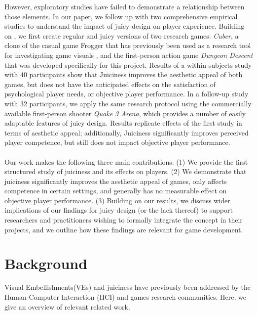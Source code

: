 \documentclass{sigchi}
\begin{document}
However, exploratory studies have failed to demonstrate a relationship between those elements. In our paper, we follow up with two comprehensive empirical studies to understand the impact of juicy design on player experience. Building on \cite{hicks2018juicy}, we first create regular and juicy versions of two research games: \textit{Cuber}, a clone of the casual game Frogger \cite{frogger:arcade} that has previously been used as a research tool for investigating game visuals \cite{gerling2013effects}, and the first-person action game \textit{Dungeon Descent} that was developed specifically for this project. Results of a within-subjects study with 40 participants show that Juiciness improves the aesthetic appeal of both games, but does not have the anticipated effects on the satisfaction of psychological player needs, or objective player performance. In a follow-up study with 32 participants, we apply the same research protocol using the commercially available first-person shooter \textit{Quake 3 Arena}, which provides a number of easily adaptable features of juicy design. Results replicate effects of the first study in terms of aesthetic appeal; additionally, Juiciness  significantly improves perceived player competence, but still does not impact objective player performance.
\\\\
Our work makes the following three main contributions: (1) We provide the first structured study of juiciness and its effects on players. (2) We demonstrate that juiciness significantly improves the aesthetic appeal of games, only affects competence in certain settings, and generally has no measurable effect on objective player performance. (3) Building on our results, we discuss wider implications of our findings for juicy design (or the lack thereof) to support researchers and practitioners wishing to formally integrate the concept in their projects, and we outline how these findings are relevant for game development.

\section{Background}
Visual Embellishments(VEs) and juiciness have previously been addressed by the Human-Computer Interaction (HCI) and games research communities. Here, we give an overview of relevant related work.
\end{document}
